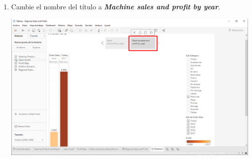 \documentclass[12pt,letterpaper]{article}
\begin{document}
\begin{enumerate}
\begin{center}
        \end{center}
        \item Cambie el nombre del título a \textit{\textbf{Machine sales and profit by year}}.
        \begin{center}
            \includegraphics[width=15cm]{./img/img92.png}
        \end{center}
    \end{enumerate}
\end{document}

